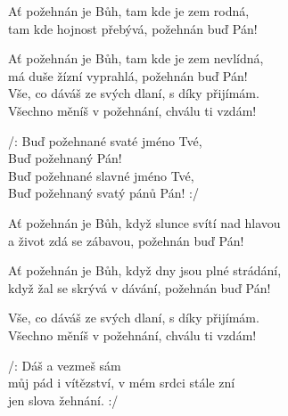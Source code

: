 
\ve{}
Ať požehnán je Bůh, tam kde je zem rodná, \\
tam kde hojnost přebývá, požehnán buď Pán!

\ve{}
Ať požehnán je Bůh, tam kde je zem nevlídná, \\
má duše žízní vyprahlá, požehnán buď Pán! \\

\re{*}
Vše, co dáváš ze svých dlaní, s díky přijímám. \\
Všechno měníš v požehnání, chválu ti vzdám!

\cho{}
/: Buď požehnané svaté jméno Tvé, \\
Buď požehnaný Pán!\  \\
Buď požehnané slavné jméno Tvé, \\
Buď požehnaný svatý pánů Pán! :/

\ve{}
Ať požehnán je Bůh, když slunce svítí nad hlavou \\
a život zdá se zábavou, požehnán buď Pán!

\ve{}
Ať požehnán je Bůh, když dny jsou plné strádání, \\
když žal se skrývá v dávání, požehnán buď Pán!

\re{*}
Vše, co dáváš ze svých dlaní, s díky přijímám. \\
Všechno měníš v požehnání, chválu ti vzdám!

/: Dáš a vezmeš sám \\
můj pád i vítězství,
v mém srdci stále zní \\
jen slova žehnání. :/

\cho{}

\esong